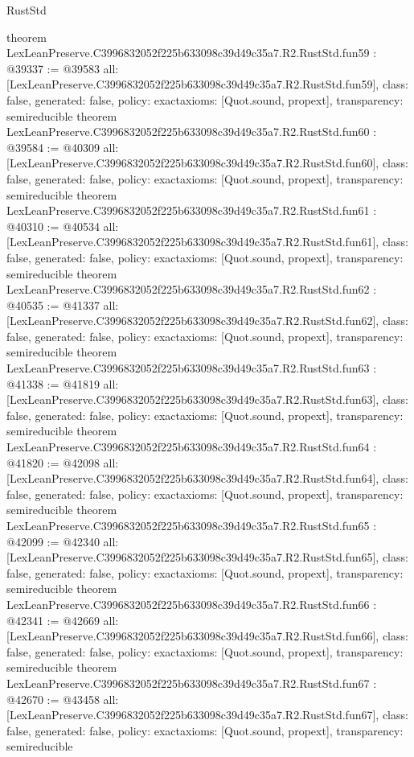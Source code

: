 \begin{lexlean}{RustStd}
\begin{coremodule}
{}
theorem LexLeanPreserve.C3996832052f225b633098c39d49c35a7.R2.RustStd.fun59 : @39337 := @39583 {
  all: [LexLeanPreserve.C3996832052f225b633098c39d49c35a7.R2.RustStd.fun59],
  class: false,
  generated: false,
  policy: exact{axioms: [Quot.sound, propext]},
  transparency: semireducible
}
theorem LexLeanPreserve.C3996832052f225b633098c39d49c35a7.R2.RustStd.fun60 : @39584 := @40309 {
  all: [LexLeanPreserve.C3996832052f225b633098c39d49c35a7.R2.RustStd.fun60],
  class: false,
  generated: false,
  policy: exact{axioms: [Quot.sound, propext]},
  transparency: semireducible
}
theorem LexLeanPreserve.C3996832052f225b633098c39d49c35a7.R2.RustStd.fun61 : @40310 := @40534 {
  all: [LexLeanPreserve.C3996832052f225b633098c39d49c35a7.R2.RustStd.fun61],
  class: false,
  generated: false,
  policy: exact{axioms: [Quot.sound, propext]},
  transparency: semireducible
}
theorem LexLeanPreserve.C3996832052f225b633098c39d49c35a7.R2.RustStd.fun62 : @40535 := @41337 {
  all: [LexLeanPreserve.C3996832052f225b633098c39d49c35a7.R2.RustStd.fun62],
  class: false,
  generated: false,
  policy: exact{axioms: [Quot.sound, propext]},
  transparency: semireducible
}
theorem LexLeanPreserve.C3996832052f225b633098c39d49c35a7.R2.RustStd.fun63 : @41338 := @41819 {
  all: [LexLeanPreserve.C3996832052f225b633098c39d49c35a7.R2.RustStd.fun63],
  class: false,
  generated: false,
  policy: exact{axioms: [Quot.sound, propext]},
  transparency: semireducible
}
theorem LexLeanPreserve.C3996832052f225b633098c39d49c35a7.R2.RustStd.fun64 : @41820 := @42098 {
  all: [LexLeanPreserve.C3996832052f225b633098c39d49c35a7.R2.RustStd.fun64],
  class: false,
  generated: false,
  policy: exact{axioms: [Quot.sound, propext]},
  transparency: semireducible
}
theorem LexLeanPreserve.C3996832052f225b633098c39d49c35a7.R2.RustStd.fun65 : @42099 := @42340 {
  all: [LexLeanPreserve.C3996832052f225b633098c39d49c35a7.R2.RustStd.fun65],
  class: false,
  generated: false,
  policy: exact{axioms: [Quot.sound, propext]},
  transparency: semireducible
}
theorem LexLeanPreserve.C3996832052f225b633098c39d49c35a7.R2.RustStd.fun66 : @42341 := @42669 {
  all: [LexLeanPreserve.C3996832052f225b633098c39d49c35a7.R2.RustStd.fun66],
  class: false,
  generated: false,
  policy: exact{axioms: [Quot.sound, propext]},
  transparency: semireducible
}
theorem LexLeanPreserve.C3996832052f225b633098c39d49c35a7.R2.RustStd.fun67 : @42670 := @43458 {
  all: [LexLeanPreserve.C3996832052f225b633098c39d49c35a7.R2.RustStd.fun67],
  class: false,
  generated: false,
  policy: exact{axioms: [Quot.sound, propext]},
  transparency: semireducible
}
\end{coremodule}
\end{lexlean}
